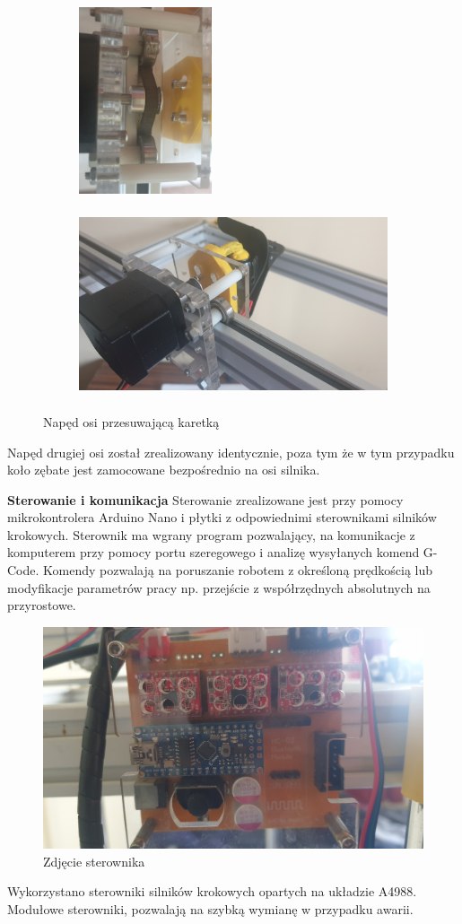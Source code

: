 \begin{figure}[H]
	\centering
	\begin{subfigure}{}
		\includegraphics[height=5.5cm]{pages/dodatekARobot/img/przeniesienieNapeduW2.jpg}
	\end{subfigure}
	\begin{subfigure}{}
		\includegraphics[height=5.5cm]{pages/dodatekARobot/img/widokNaOs2.jpg}
	\end{subfigure}
	\caption{Napęd osi przesuwającą karetką}
\end{figure}
Napęd drugiej osi został zrealizowany identycznie, poza tym że w tym przypadku koło zębate jest zamocowane bezpośrednio na osi silnika.

\textbf{Sterowanie i komunikacja} \newline
Sterowanie zrealizowane jest przy pomocy mikrokontrolera Arduino Nano i płytki z odpowiednimi sterownikami silników krokowych. 
Sterownik ma wgrany program pozwalający, na komunikacje z komputerem przy pomocy portu szeregowego i analizę wysyłanych komend G-Code.
Komendy pozwalają na poruszanie robotem z określoną prędkością lub modyfikacje parametrów pracy np. przejście z współrzędnych absolutnych na przyrostowe.

\begin{figure}[H]
	\centering
	\includegraphics[width=0.70\linewidth]{pages/dodatekARobot/img/kontroler.jpg}
	\caption{Zdjęcie sterownika}
\end{figure}
Wykorzystano sterowniki silników krokowych opartych na układzie A4988. 
Modułowe sterowniki, pozwalają na szybką wymianę w przypadku awarii.

